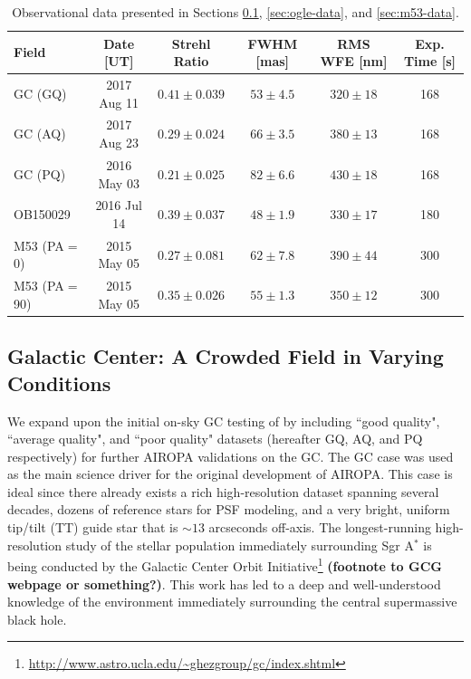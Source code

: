 \documentclass[]{spie}  %
\begin{document}
\begin{table}[!h]
\centering
\caption{Observational data presented in Sections \ref{sec:gc-data}, \ref{sec:ogle-data}, and \ref{sec:m53-data}.} \label{tab:fields-metrics}
\begin{tabular}{|l|c|c|c|c|c|}
\hline
        Field &  Date [UT] &  Strehl Ratio &  FWHM [mas] &  RMS WFE [nm] & Exp. Time [s] \\\hline\hline
        GC (GQ) &   2017 Aug 11 & $0.41 \pm 0.039$ & $53 \pm 4.5$ & $320 \pm 18$ & 168\\
        GC (AQ) &   2017 Aug 23 & $0.29 \pm 0.024$ & $66 \pm 3.5$ & $380 \pm 13$ & 168\\
        GC (PQ) &   2016 May 03 & $0.21 \pm 0.025$ & $82 \pm 6.6$ & $430 \pm 18$ & 168\\
        OB150029 &    2016 Jul 14 &  $0.39 \pm 0.037$ & $48 \pm 1.9$ & $330 \pm 17$ & 180\\
        M53 (PA$=$0) &   2015 May 05 &  $0.27 \pm 0.081$ & $62 \pm 7.8$ & $390 \pm 44$ & 300\\
        M53 (PA$=$90) &   2015 May 05 & $0.35 \pm 0.026$ & $55 \pm 1.3$ & $350 \pm 12$ & 300\\\hline
\end{tabular}
\end{table}

\subsection{Galactic Center: A Crowded Field in Varying Conditions} \label{sec:gc-data}
We expand upon the initial on-sky GC testing of \cite{Turri:inprep} by including ``good quality", ``average quality", and ``poor quality" datasets (hereafter GQ, AQ, and PQ respectively) for further AIROPA validations on the GC. The GC case was used as the main science driver for the original development of AIROPA. This case is ideal since there already exists a rich high-resolution dataset spanning several decades, dozens of reference stars for PSF modeling, and a very bright, uniform tip/tilt (TT) guide star that is ${\sim}13$ arcseconds off-axis. The longest-running high-resolution study of the stellar population immediately surrounding Sgr A$^{*}$ is being conducted by the Galactic Center Orbit Initiative\footnote[1]{\url{http://www.astro.ucla.edu/~ghezgroup/gc/index.shtml}} \textbf{(footnote to GCG webpage or something?)}. This work has led to a deep and well-understood knowledge \citep{ghez:2005b, ghez:2008a, lu:2008a, do:2019a, gautam:2019a} of the environment immediately surrounding the central supermassive black hole.
\end{document}
